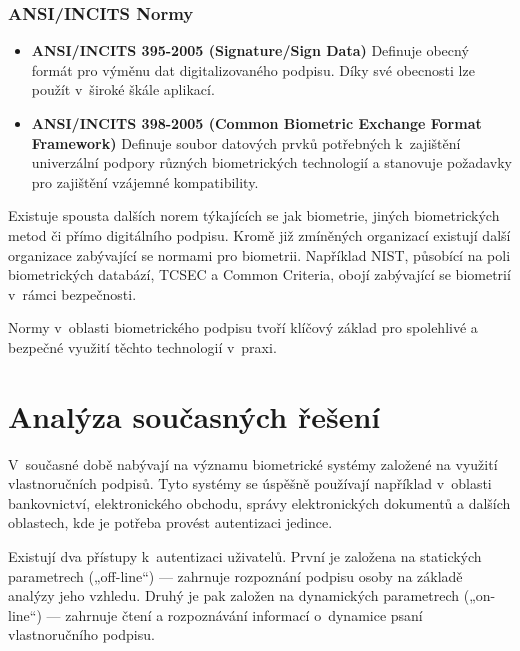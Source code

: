 \subsection*{ANSI/INCITS Normy}
\begin{itemize}
  \item \textbf{ANSI/INCITS 395-2005 (Signature/Sign Data)}  
  Definuje obecný formát pro výměnu dat digitalizovaného podpisu. Díky své obecnosti lze použít v~široké škále aplikací.~\cite{ANSI_INCITS_395_2005} %
  
  \item \textbf{ANSI/INCITS 398-2005 (Common Biometric Exchange Format Framework)}  
  Definuje soubor datových prvků potřebných k~zajištění univerzální podpory různých biometrických technologií a stanovuje požadavky pro zajištění vzájemné kompatibility.~\cite{DrahanskýMartin2011} %
\end{itemize}

Existuje spousta dalších norem týkajících se jak biometrie, jiných biometrických metod či přímo digitálního podpisu. %
Kromě již zmíněných organizací existují další organizace zabývající se normami pro biometrii.                        %
Například NIST, působící na poli biometrických databází, TCSEC a Common Criteria, obojí zabývající se biometrií v~rámci bezpečnosti.~\cite{DrahanskýMartin2011}%

Normy v~oblasti biometrického podpisu tvoří klíčový základ pro spolehlivé a bezpečné využití těchto technologií v~praxi.


\chapter{Analýza současných řešení}

V~současné době nabývají na významu biometrické systémy založené na využití vlastnoručních podpisů. 
Tyto systémy se úspěšně používají například v~oblasti bankovnictví, elektronického obchodu, správy elektronických dokumentů a dalších oblastech, kde je potřeba provést autentizaci jedince. 

Existují dva přístupy k~autentizaci uživatelů.
První je založena na statických parametrech („off-line“) --- zahrnuje rozpoznání podpisu osoby na základě analýzy jeho vzhledu.
Druhý je pak založen na dynamických parametrech („on-line“) --- zahrnuje čtení a rozpoznávání informací o~dynamice psaní vlastnoručního podpisu.~\cite{9306154} %

